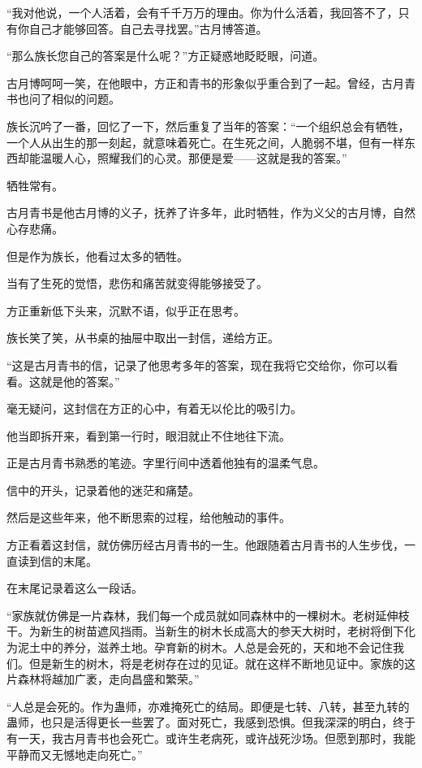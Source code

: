 
\begin{this_body}

“我对他说，一个人活着，会有千千万万的理由。你为什么活着，我回答不了，只有你自己才能够回答。自己去寻找罢。”古月博答道。

“那么族长您自己的答案是什么呢？”方正疑惑地眨眨眼，问道。

古月博呵呵一笑，在他眼中，方正和青书的形象似乎重合到了一起。曾经，古月青书也问了相似的问题。

族长沉吟了一番，回忆了一下，然后重复了当年的答案：“一个组织总会有牺牲，一个人从出生的那一刻起，就意味着死亡。在生死之间，人脆弱不堪，但有一样东西却能温暖人心，照耀我们的心灵。那便是爱——这就是我的答案。”

牺牲常有。

古月青书是他古月博的义子，抚养了许多年，此时牺牲，作为义父的古月博，自然心存悲痛。

但是作为族长，他看过太多的牺牲。

当有了生死的觉悟，悲伤和痛苦就变得能够接受了。

方正重新低下头来，沉默不语，似乎正在思考。

族长笑了笑，从书桌的抽屉中取出一封信，递给方正。

“这是古月青书的信，记录了他思考多年的答案，现在我将它交给你，你可以看看。这就是他的答案。”

毫无疑问，这封信在方正的心中，有着无以伦比的吸引力。

他当即拆开来，看到第一行时，眼泪就止不住地往下流。

正是古月青书熟悉的笔迹。字里行间中透着他独有的温柔气息。

信中的开头，记录着他的迷茫和痛楚。

然后是这些年来，他不断思索的过程，给他触动的事件。

方正看着这封信，就仿佛历经古月青书的一生。他跟随着古月青书的人生步伐，一直读到信的末尾。

在末尾记录着这么一段话。

“家族就仿佛是一片森林，我们每一个成员就如同森林中的一棵树木。老树延伸枝干。为新生的树苗遮风挡雨。当新生的树木长成高大的参天大树时，老树将倒下化为泥土中的养分，滋养土地。孕育新的树木。人总是会死的，天和地不会记住我们。但是新生的树木，将是老树存在过的见证。就在这样不断地见证中。家族的这片森林将越加广袤，走向昌盛和繁荣。”

“人总是会死的。作为蛊师，亦难掩死亡的结局。即便是七转、八转，甚至九转的蛊师，也只是活得更长一些罢了。面对死亡，我感到恐惧。但我深深的明白，终于有一天，我古月青书也会死亡。或许生老病死，或许战死沙场。但愿到那时，我能平静而又无憾地走向死亡。”


\end{this_body}
